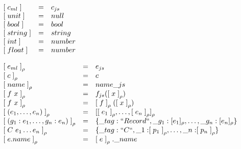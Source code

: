 \clearpage

\begin{center}
$
\begin{array}{lll}
\mathrel{{[}} c_{ml} \mathrel{{]}} &=& c_{js} \\
\mathrel{{[}} unit \mathrel{{]}} &=& null \\
\mathrel{{[}} bool \mathrel{{]}} &=& bool \\
\mathrel{{[}} string \mathrel{{]}} &=& string \\ 
\mathrel{{[}} int \mathrel{{]}} &=& number \\
\mathrel{{[}} float \mathrel{{]}} &=& number
\end{array}
$
\captionsetup{type=lstlisting}
\label{tbl:tr_const}
\end{center}

\begin{center}
\small
$
\begin{array}{lll}
\mathrel{{[}} e_{ml} \mathrel{{]}} _{\rho} &=& e_{js} \\
\mathrel{{[}} c \mathrel{{]}} _{\rho} &=& c \\
\mathrel{{[}} name \mathrel{{]}} _{\rho} &=& name\_js \\
\mathrel{{[}} f~x \mathrel{{]}} _{\rho} &=&  f_{js}(\mathrel{{[}} x \mathrel{{]}} _{\rho}) \\
\mathrel{{[}} f~x \mathrel{{]}} _{\rho} &=& \mathrel{{[}} f \mathrel{{]}} _{\rho} (\mathrel{{[}} x \mathrel{{]}} _{\rho}) \\
\mathrel{{[}} (e_1, \dots, e_n) \mathrel{{]}} _{\rho} &=& \mathrel{{[}} \mathrel{{[}} e_1 \mathrel{{]}} _{\rho}, \ldots, \mathrel{{[}} e_n \mathrel{{]}} _{\rho} \mathrel{{]}} _{\rho} \\
\mathrel{{[}} (g_1:e_1,\dots,g_n:e_n)\mathrel{{]}}_{\rho}&=&\{\_tag:``Record``,\_g_1:[e_1]_\rho,\dots,\_g_n: [e_n]_\rho\} \\
\mathrel{{[}} C~e_1 \dots e_n  \mathrel{{]}} _{\rho} &=& \{ \_tag: ``C``, \_1: \mathrel{{[}} p_1 \mathrel{{]}} _{\rho}, \ldots, \_n: \mathrel{{[}} p_n \mathrel{{]}} _{\rho} \} \\
\mathrel{{[}} e.name \mathrel{{]}} _{\rho} &=& \mathrel{{[}} e \mathrel{{]}} _{\rho}.\_name 
\end{array}
$\normalsize
\captionsetup{type=lstlisting}
\label{tbl:tr_expr}
\end{center}


